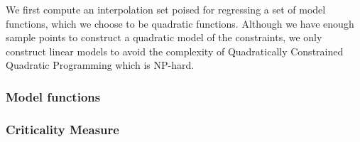 \documentclass{article}
\DeclareMathOperator*{\argmin}{arg\,min}
\let\oldref\ref
\renewcommand{\ref}[1]{(\oldref{#1})}
\begin{document}
We first compute an interpolation set poised for regressing a set of model functions, which we choose to be quadratic functions.
Although we have enough sample points to construct a quadratic model of the constraints, we only construct linear models to avoid the complexity of Quadratically Constrained Quadratic Programming which is NP-hard.

\subsubsection{Model functions}







\subsubsection{Criticality Measure}
\end{document}
